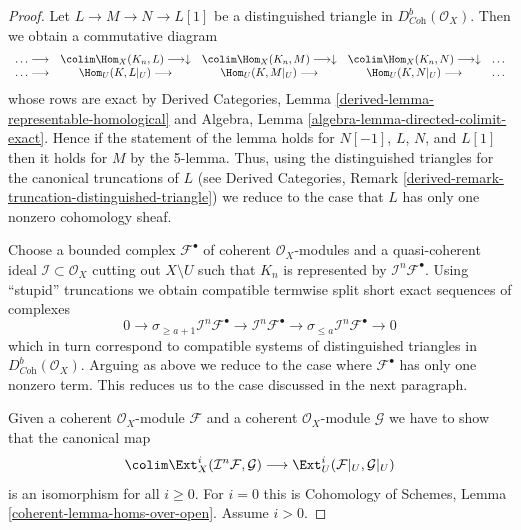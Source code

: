 \begin{proof}
Let $L \to M \to N \to L[1]$ be a distinguished triangle in
$D^b_{\textit{Coh}}(\mathcal{O}_X)$. Then we obtain
a commutative diagram
$$
\begin{array}{ccccc}\ldots \longrightarrow & \colim \Hom_X(K_n, L) \longrightarrow\downarrow & \colim \Hom_X(K_n, M) \longrightarrow\downarrow & \colim \Hom_X(K_n, N) \longrightarrow\downarrow & \ldots \\ \ldots \longrightarrow & \Hom_U(K, L|_U) \longrightarrow & \Hom_U(K, M|_U) \longrightarrow & \Hom_U(K, N|_U) \longrightarrow & \ldots\end{array}
$$
whose rows are exact by Derived Categories, Lemma
\ref{derived-lemma-representable-homological} and
Algebra, Lemma \ref{algebra-lemma-directed-colimit-exact}.
Hence if the statement of the lemma holds for
$N[-1]$, $L$, $N$, and $L[1]$ then it holds for $M$ by the 5-lemma.
Thus, using the distinguished triangles
for the canonical truncations of $L$ (see Derived Categories, Remark
\ref{derived-remark-truncation-distinguished-triangle})
we reduce to the case that $L$ has only one nonzero cohomology sheaf.

\medskip\noindent
Choose a bounded complex $\mathcal{F}^\bullet$ of coherent
$\mathcal{O}_X$-modules and a quasi-coherent ideal
$\mathcal{I} \subset \mathcal{O}_X$ cutting out $X \setminus U$
such that $K_n$ is represented by $\mathcal{I}^n\mathcal{F}^\bullet$.
Using ``stupid'' truncations we obtain compatible termwise split short
exact sequences of complexes
$$
0 \to \sigma_{\geq a + 1} \mathcal{I}^n\mathcal{F}^\bullet \to
\mathcal{I}^n\mathcal{F}^\bullet \to
\sigma_{\leq a} \mathcal{I}^n\mathcal{F}^\bullet \to 0
$$
which in turn correspond to compatible systems of distinguished
triangles in $D^b_{\textit{Coh}}(\mathcal{O}_X)$.
Arguing as above we reduce to the case where $\mathcal{F}^\bullet$
has only one nonzero term. This reduces us to the case discussed in
the next paragraph.

\medskip\noindent
Given a coherent $\mathcal{O}_X$-module $\mathcal{F}$ and a coherent
$\mathcal{O}_X$-module $\mathcal{G}$ we
have to show that the canonical map
$$
\colim \Ext^i_X(\mathcal{I}^n\mathcal{F}, \mathcal{G})
\longrightarrow
\Ext^i_U(\mathcal{F}|_U, \mathcal{G}|_U)
$$
is an isomorphism for all $i \geq 0$. For $i = 0$ this is
Cohomology of Schemes, Lemma \ref{coherent-lemma-homs-over-open}.
Assume $i > 0$.


\end{proof}
